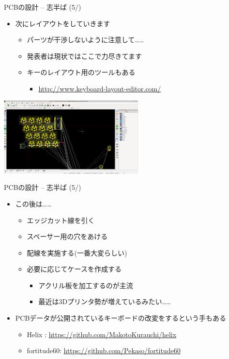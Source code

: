 \documentclass[cjk,dvipdfmx,10pt,compress,fragile%
hyperref={bookmarks=true,bookmarksnumbered=true,bookmarksopen=false,%
colorlinks=false,%
pdftitle={第 134 回 関西 Debian 勉強会},%
pdfauthor={小林},%
pdfsubject={資料},%
}]{beamer}
\begin{document}
\begin{frame}[fragile,t]{PCBの設計 -- 志半ば (5/)}
 \begin{itemize}
  \item 次にレイアウトをしていきます
	\begin{itemize}
	 \item パーツが干渉しないように注意して……
	 \item 発表者は現状ではここで力尽きてます
	 \item キーのレイアウト用のツールもある
	       \begin{itemize}
		\item \url{http://www.keyboard-layout-editor.com/}
	       \end{itemize}
	\end{itemize}
 \end{itemize}
 \begin{center}
  \includegraphics[keepaspectratio,height=4cm]{./img/kicad-layout.png}
 \end{center}
\end{frame}

\begin{frame}[fragile,t]{PCBの設計 -- 志半ば (5/)}
 \begin{itemize}
  \item この後は……
	\begin{itemize}
	 \item エッジカット線を引く
	 \item スペーサー用の穴をあける
	 \item 配線を実施する(一番大変らしい)
	 \item 必要に応じてケースを作成する
	       \begin{itemize}
		\item アクリル板を加工するのが主流
		\item 最近は3Dプリンタ勢が増えているみたい……
	       \end{itemize}
	\end{itemize}
  \item PCBデータが公開されているキーボードの改変をするという手もある
	\begin{itemize}
	 \item Helix : \url{https://github.com/MakotoKurauchi/helix}
	 \item fortitude60: \url{https://github.com/Pekaso/fortitude60}
	\end{itemize}
 \end{itemize}
\end{frame}
\end{document}
